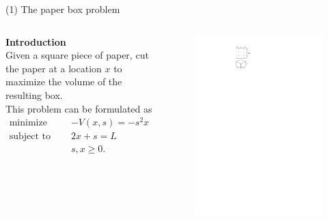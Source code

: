 \documentclass[11pt, aspectratio=149]{beamer}
\theoremstyle{plain}
\begin{document}

\begin{frame}[fragile, t]{(1) The paper box problem}
\begin{columns}
\begin{column}{0.55\textwidth}
\textbf{Introduction}\\ \vspace*{0.5em} 
Given a square piece of paper, cut the paper at a location $x$ to maximize the volume of the resulting box. \\
\vspace*{1em}
This problem can be formulated as
\begin{align*}
\text{minimize } \quad & -V(x, s) = -s^2 x  \\
\text{subject to } \quad & 2x + s = L \\
& s, x \geq 0.
\end{align*}
\end{column}
\begin{column}{0.45\textwidth}%
	\begin{figure}
		\centering
		\includegraphics[width=0.75\linewidth]{figs/box_opt.pdf}
	\end{figure}
\end{column}
\end{columns}
\end{frame}
\end{document}
